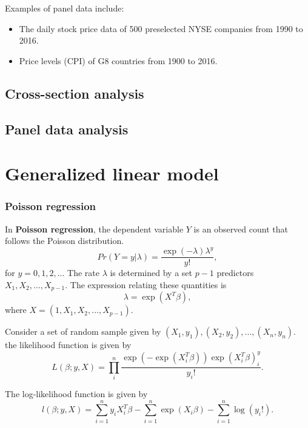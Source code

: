 \begin{refsection}
\begin{example}
	Examples of panel data include:
	\begin{itemize}
		\item The daily stock price data of 500 preselected NYSE companies from 1990 to 2016.
		\item Price levels (CPI) of G8 countries from 1900 to 2016.
	\end{itemize}
\end{example}


\subsection{Cross-section analysis}



\subsection{Panel data analysis}



\section{Generalized linear model}
\subsubsection{Poisson regression}

\begin{definition}
In \textbf{Poisson regression}, the dependent variable $Y$ is an observed count that follows the Poisson distribution.
$$Pr(Y=y|\lambda) = \frac{\exp(-\lambda)\lambda^y}{y!},$$
for $y=0,1,2,...$
 The rate $\lambda$ is determined by a set $p-1$ predictors $X_1,X_2,...,X_{p-1}$. The expression relating these quantities is
 $$\lambda = \exp(X^T\beta),$$
where $X=(1,X_1,X_2,...,X_{p-1}).$ 	
\end{definition}


\begin{lemma}
Consider a set of random sample given by $(X_1,y_1),(X_2,y_2),...,(X_n,y_n)$.
the likelihood function is given by
$$L(\beta;y,X) = \prod_i^n \frac{\exp(-\exp(X_i^T\beta))\exp(X_i^T\beta)^y_i}{y_i!}.$$

The log-likelihood function is given by
$$l(\beta;y,X) = \sum_{i=1}^n y_iX_i^T\beta - \sum_{i=1}^n \exp(X_i\beta) - \sum_{i=1}^{n}\log(y_i!).$$	
\end{lemma}




\end{refsection}
